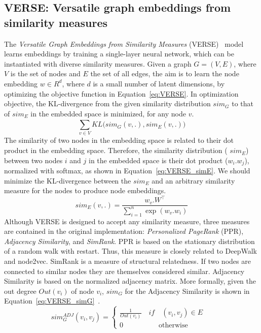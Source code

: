 \subsection{VERSE: Versatile graph embeddings from similarity measures}
\label{subsec:VERSE}
The \emph{Versatile Graph Embeddings from Similarity Measures} (VERSE)~ model learns embeddings by training a single-layer neural network, which can be instantiated with diverse similarity measures. Given a graph $G=(V,E)$, where $V$ is the set of nodes and $E$ the set of all edges, the aim is to learn the node embedding $w \in R^{d}$, where $d$ is a small number of latent dimensions, by optimizing the objective function in Equation~\ref{eq:VERSE}. In optimization objective, the KL-divergence from the given similarity distribution $sim_G$ to that of $sim_E$ in the embedded space is minimized, for any node $v$. 
\begin{equation}
\sum _{ v\in V }^{  }{ KL(sim_{ G }(v,.),sim_{ E } } (v,.))
\label{eq:VERSE}
\end{equation}
The similarity of two nodes in the embedding space is related to their dot product in the embedding space. Therefore, the similarity distribution ( $sim_E$) between two nodes $i$ and $j$ in the embedded space is their dot product ($w_i . w_j$), normalized with softmax, as shown in Equation~\ref{eq:VERSE_simE}. We should minimize the KL-divergence between the $sim_{ E }$ and an arbitrary similarity measure for the nodes to produce node embeddings. 
\begin{equation}
sim_{ E }(v,.)=\frac{ w_{ v }.W^\top }{ \sum _{ i=1 }^{ n }{ \exp{(w_{ v }.w_{ i }) }}  }\label{eq:VERSE_simE}
\end{equation}
Although VERSE is designed to accept any similarity measure, three measures are contained in the original implementation: \emph{Personalized PageRank} (PPR),  \emph{Adjacency Similarity}, and  \emph{SimRank}. PPR is based on the stationary distribution of a random walk with restart. Thus, this measure is closely related to DeepWalk and node2vec. SimRank is a measure of structural relatedness. If two nodes are connected to similar nodes they are themselves considered similar. Adjacency Similarity is based on the normalized adjacency matrix. More formally, given the out degree $Out(v_{i})$ of node $v_{i}$, $sim_{ G }$ for the Adjacency Similarity is shown in Equation~\ref{eq:VERSE_simG}~. 
\begin{equation}
sim^{ ADJ }_{ G }(v_{ i },v_{ j })=\left\{ \begin{matrix} \frac { 1 }{ Out(v_{ i }) } \quad if\quad (v_{ i },v_{ j })\in E\quad  \\ 0\quad \qquad \qquad \mathrm{otherwise} \end{matrix} \right.\label{eq:VERSE_simG}
\end{equation}
